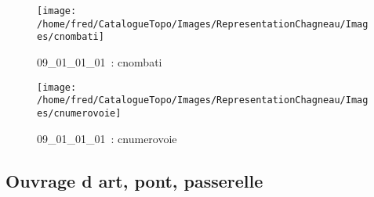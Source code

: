 \documentclass[12pt,titlepage]{book}
\begin{document}
\begin{figure}[h!]
  \begin{minipage}[t]{3cm}
    \begin{center}
      \texttt{[image: /home/fred/CatalogueTopo/Images/RepresentationChagneau/Images/cnombati]}
      \caption[~09\_01\_01\_01]{\small{09\_01\_01\_01~:} \tiny{cnombati}}\label{cnombati}
    \end{center}
  \end{minipage}
  \begin{minipage}[t]{3cm}
    \begin{center}
      \texttt{[image: /home/fred/CatalogueTopo/Images/RepresentationChagneau/Images/cnumerovoie]}
      \caption[~09\_01\_01\_01]{\small{09\_01\_01\_01~:} \tiny{cnumerovoie}}\label{cnumerovoie}
    \end{center}
  \end{minipage}
\end{figure}


\subsection{Ouvrage d art, pont, passerelle}
\noindent
\vspace{\baselineskip}
\end{document}
